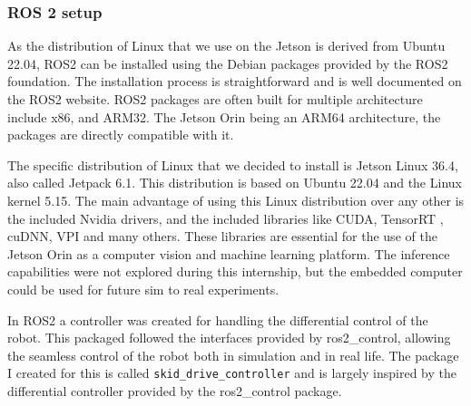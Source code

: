 \documentclass[12pt]{article}
\begin{document}
        \subsubsection{ROS 2 setup}
        
        As the distribution of Linux that we use on the Jetson is derived from Ubuntu 22.04, ROS2 can be installed using the Debian packages provided by the ROS2 foundation. The installation process is straightforward \cite{ros2_installation} and is well documented on the ROS2 website. ROS2 packages are often built for multiple architecture include x86, and ARM32. The Jetson Orin being an ARM64 architecture, the packages are directly compatible with it. 

        The specific distribution of Linux that we decided to install is Jetson Linux 36.4, also called Jetpack 6.1. This distribution is based on Ubuntu 22.04 and the Linux kernel 5.15. The main advantage of using this Linux distribution over any other is the included Nvidia drivers, and the included libraries like CUDA\cite{cuda}, TensorRT \cite{tensorrt}, cuDNN\cite{cudnn}, VPI and many others. These libraries are essential for the use of the Jetson Orin as a computer vision and machine learning platform. The inference capabilities were not explored during this internship, but the embedded computer could be used for future sim to real \cite{peng2018sim} experiments. 

        In ROS2 a controller was created for handling the differential control of the robot. This packaged followed the interfaces provided by ros2\_control, allowing the seamless control of the robot both in simulation and in real life. The package I created for this is called \texttt{skid\_drive\_controller} and is largely inspired by the differential controller provided by the ros2\_control package.
        
\end{document}

